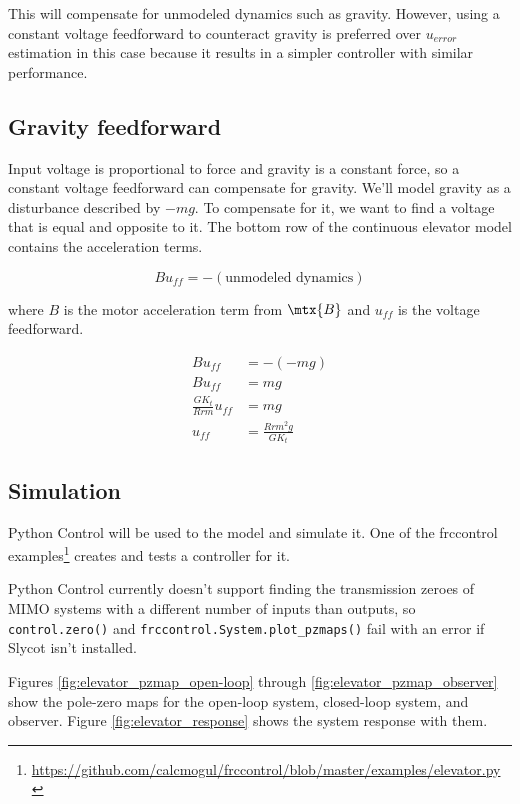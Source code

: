 This will compensate for unmodeled dynamics such as gravity. However, using a
constant voltage feedforward to counteract gravity is preferred over $u_{error}$
estimation in this case because it results in a simpler controller with similar
performance.

\subsection{Gravity feedforward}

Input voltage is proportional to force and gravity is a constant force, so a
constant voltage feedforward can compensate for gravity. We'll model gravity as
a disturbance described by $-mg$. To compensate for it, we want to find a
voltage that is equal and opposite to it. The bottom row of the continuous
elevator model contains the acceleration terms.

\begin{equation*}
  Bu_{ff} = -(\text{unmodeled dynamics})
\end{equation*}

where $B$ is the motor acceleration term from $\mtx{B}$ and $u_{ff}$ is the
voltage feedforward.

\begin{align*}
  Bu_{ff} &= -(-mg) \\
  Bu_{ff} &= mg \\
  \frac{G K_t}{Rrm} u_{ff} &= mg \\
  u_{ff} &= \frac{Rrm^2 g}{G K_t}
\end{align*}

\subsection{Simulation}

Python Control will be used to  the
\gls{model} and simulate it. One of the frccontrol
examples\footnote{\url{https://github.com/calcmogul/frccontrol/blob/master/examples/elevator.py}}
creates and tests a controller for it.

\begin{remark}
  Python Control currently doesn't support finding the transmission zeroes of
  MIMO \glspl{system} with a different number of \glspl{input} than
  \glspl{output}, so \texttt{control.zero()} and
  \texttt{frccontrol.System.plot\_pzmaps()} fail with an error if Slycot isn't
  installed.
\end{remark}

Figures \ref{fig:elevator_pzmap_open-loop} through
\ref{fig:elevator_pzmap_observer} show the pole-zero maps for the open-loop
\gls{system}, closed-loop \gls{system}, and \gls{observer}. Figure
\ref{fig:elevator_response} shows the \gls{system} response with them.

